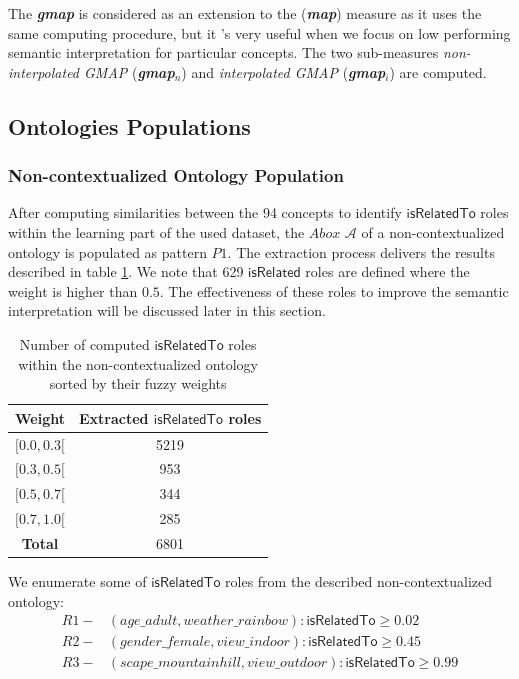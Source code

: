 			The \textit{\textbf{gmap}} is 
			considered as an extension to the (\textit{\textbf{map}}) 
			measure as it uses the same computing procedure, but it 's very useful
			when we focus on low performing semantic interpretation for particular concepts.
			The two sub-measures \emph{non-interpolated GMAP} (\textit{\textbf{gmap$_{n}$}}) and
			\emph{interpolated GMAP} (\textit{\textbf{gmap$_{i}$}}) are computed.

		\subsection{Ontologies Populations}
			\subsubsection{Non-contextualized Ontology Population}
		After computing similarities between the 94 concepts to identify $\mathsf{isRelatedTo}$ roles
		within the learning part of the used dataset, the $Abox$ $\mathcal{A}$ of a non-contextualized ontology 
		is populated as pattern $P1$.
		The extraction process delivers the results described in table \ref{table:context-less_ontology}.
		We note that 629 $\mathsf{isRelated}$ roles are defined where the weight is higher than $0.5$.
		The effectiveness of these roles to improve the semantic interpretation 
		will be discussed later in this section.

		\begin{table}
			\centering	
			\caption{Number of computed  $\mathsf{isRelatedTo}$ roles within the 
				non-contextualized ontology sorted by their fuzzy weights}
			\label{table:context-less_ontology}
			\begin{tabular}{cc} \hline
				\textbf{Weight}& \textbf{Extracted $\mathsf{isRelatedTo}$ roles}\\
				\hline
				\small{$[0.0, 0.3[$}  & 5219\\ 
				\small{$[0.3, 0.5[$}  & 953\\ 
				\small{$[0.5, 0.7[$}  & 344\\
				\small{$[0.7, 1.0[$}  & 285\\ \hline
				\textbf{Total}  & 6801\\ \hline
			\end{tabular}
		\end{table}

		We enumerate some of $\mathsf{isRelatedTo}$ roles from the described non-contextualized ontology:
		\begin{align*}
 			R1-&(age\_adult,weather\_rainbow):\mathsf{isRelatedTo} \geq 0.02\\
			R2-&(gender\_female,view\_indoor):\mathsf{isRelatedTo} \geq 0.45\\
			R3-&(scape\_mountainhill,view\_outdoor):\mathsf{isRelatedTo} \geq 0.99
		\end{align*}

